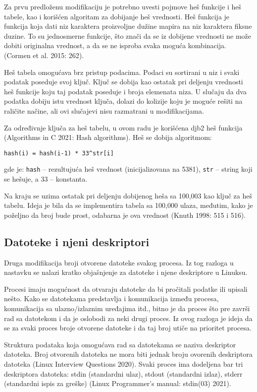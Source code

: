 Za prvu predloženu modifikaciju je potrebno uvesti pojmove heš funkcije i heš tabele, kao i
korišćen algoritam za dobijanje heš vrednosti.
Heš funkcija je funkcija koja dati niz karaktera proizvoljne dužine mapira na niz karaktera
fiksne duzine. To su jednosmerne funkcije, što znači da se iz dobijene vrednosti ne može
dobiti originalna vrednost, a da se ne isproba svaka moguća kombinacija. (Cormen et al.
2015: 262).

Heš tabela omogućava brz pristup podacima. Podaci su sortirani u niz i svaki podatak
poseduje svoj ključ. Ključ se dobija kao ostatak pri deljenju vrednosti heš funkcije koju taj
podatak poseduje i broja elemenata niza. U slučaju da dva podatka dobiju istu vrednost
ključa, dolazi do kolizije koju je moguće rešiti na raličite načine, ali ovi slučajevi nisu
razmatrani u modifikacijama.

Za određivnje ključa za heš tabelu, u ovom radu je korišćena djb2 heš funkcija (Algorithms in
C 2021: Hash algorithms). Heš se dobija algoritmom:

\verb|hash(i) = hash(i-1) * 33^str[i]|

gde je: \texttt{hash} – rezultujuća heš vrednost (inicijalizovana na 5381), \texttt{str} – string koji se hešuje, a
33 – konstanta.

Na kraju se uzima ostatak pri deljenju dobijenog heša sa 100,003 kao ključ za heš tabelu.
Ideja je bila da se implementira tabela sa 100,000 ulaza, međutim, kako je poželjno da broj
bude prost, odabarna je ova vrednost (Knuth 1998: 515 i 516).

\subsection{Datoteke i njeni deskriptori}

Druga modifikacija broji otvorene datoteke svakog procesa. Iz tog razloga u nastavku se
nalazi kratko objašnjenje za datoteke i njene deskriptore u Linuksu.

Procesi imaju mogućnost da otvaraju datoteke da bi pročitali podatke ili upisali nešto. Kako
se datotekama predstavlja i komunikacija između procesa, komunikacija sa ulazno/izlaznim
uređajima itd., bitno je da proces što pre završi rad sa datotekom i da je oslobodi za neki
drugi proces. Iz ovog razloga je ideja da se za svaki proces broje otvorene datoteke i da taj
broj utiče na prioritet procesa.

Struktura podataka koja omogućava rad sa datotekama se naziva deskriptor datoteka. Broj
otvorenih datoteka ne mora biti jednak broju ovorenih deskriptora datoteka (Linux Interview
Questions 2020). Svaki proces ima dodeljena bar tri deskriptora datoteka: stdin (standardni
ulaz), stdout (standardni izlaz), stderr (standardni ispis za greške) (Linux Programmer’s
manual: stdin(03) 2021).

